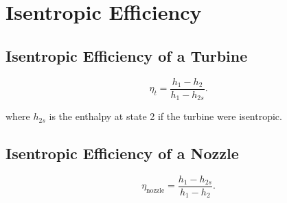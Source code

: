 \documentclass{report}
\begin{document}
\section{Isentropic Efficiency}

\subsection{Isentropic Efficiency of a Turbine}

\[
	\eta_t = \frac{h_1 - h_2}{h_1 - h_{2s}}
	.\]

where $h_{2s}$ is the enthalpy at state 2 if the turbine were isentropic.

\subsection{Isentropic Efficiency of a Nozzle}

\[
	\eta_\text{nozzle} = \frac{h_1 - h_{2s}}{h_1-h_2}
	.\]
\end{document}
